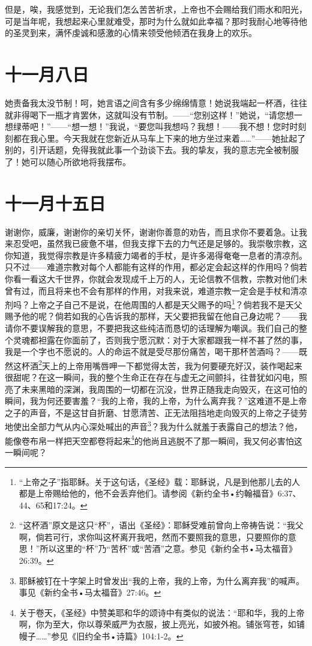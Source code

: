 \documentclass[12pt,oneside]{book}
\begin{document}
但是，唉，我感觉到，无论我们怎么苦苦祈求，上帝也不会赐给我们雨水和阳光，可是当年呢，我想起来心里就难受，那时为什么就如此幸福？那时我耐心地等待他的圣灵到来，满怀虔诚和感激的心情来领受他倾洒在我身上的欢乐。
　　

\chapter{十一月八日}
\label{sec-4-25}
她责备我太没节制！呵，她言语之间含有多少绵绵情意！她说我端起一杯酒，往往就非得喝下一瓶才肯罢休，这就叫没有节制。——“您别这样！”她说，“请您想一想绿蒂吧！”——“想一想！”我说，“要您叫我想吗？我想！——我不想！您时时刻刻都在我心里。今天我就在您新近从马车上下来的地方坐过来着……”——她扯起了别的，引开话题，免得我就此事一个劲谈下去。我的挚友，我的意志完全被制服了！她可以随心所欲地将我摆布。
　　

\chapter{十一月十五日}
\label{sec-4-26}
谢谢你，威廉，谢谢你的亲切关怀，谢谢你善意的劝告，而且求你不要着急。让我来忍受吧，虽然我已疲惫不堪，但我支撑下去的力气还是足够的。我崇敬宗教，这你知道，我觉得宗教是许多精疲力竭者的手杖，是许多渴得奄奄一息者的清凉剂。只不过——难道宗教对每个人都能有这样的作用，都必定会起这样的作用吗？倘若你看一看这大千世界，你就会发现成千上万的人，无论信教不信教，宗教对他们未曾有过，而且将来也不会有那样的作用，对我来说，难道宗教一定会是手杖和清凉剂吗？上帝之子自己不是说，在他周围的人都是天父赐予的吗\footnote{“上帝之子”指耶稣。关于这句话，《圣经》载：耶稣说，凡是到他那儿去的人都是上帝赐给他的，他不会丢弃他们。请参阅《新约全书•约翰福音》6:37、44、65和17:24。}？倘若我不是天父赐予他的呢？倘若如我的心告诉我的那样，天父要把我留在他自己身边呢？——我请你不要误解我的意思，不要把我这些纯洁而恳切的话理解为嘲讽。我们自己的整个灵魂都袒露在你面前了，否则我宁愿沉默：对于大家都跟我一样不甚了然的事，我是一个字也不愿说的。人的命运不就是受尽那份痛苦，喝干那杯苦酒吗？——既然这杯酒\footnote{“这杯酒”原文是这只“杯”，语出《圣经》：耶稣受难前曾向上帝祷告说：“我父啊，倘若可行，求你叫这杯离开我吧，然而不要照我的意思，只要照你的意思！”所以这里的“杯”乃“苦杯”或“苦酒”之意。参见《新约全书•马太福音》26:39。}天上的上帝用嘴唇呷一下都觉得太苦，我为何要硬充好汉，装作喝起来很甜呢？在这一瞬间，我的整个生命正在存在与虚无之间颤抖，往昔犹如闪电，照亮了未来黑暗的深渊，我周围的一切都在沉没，世界正随我走向毁灭，在这可怕的瞬间，我为何还要害羞？“我的上帝，我的上帝，为什么离弃我？”这难道不是上帝之子的声音，不是这甘自折磨、甘愿清苦、正无法阻挡地走向毁灭的上帝之子徒劳地使出全部力气从内心深处喊出的声音\footnote{耶稣被钉在十字架上时曾发出“我的上帝，我的上帝，为什么离弃我”的喊声。事见《新约全书•马太福音》27:46。}？我为什么就羞于表露自己的想法？他，能像卷布帛一样把天空都卷将起来\footnote{关于卷天，《圣经》中赞美耶和华的颂诗中有类似的说法：“耶和华，我的上帝啊，你为至大，你以尊荣威严为衣服，披上亮光，如披外袍。铺张穹苍，如铺幔子……”参见《旧约全书•诗篇》104:1-2。}的他尚且逃脱不了那一瞬间，我又何必害怕这一瞬间呢？
　　
\end{document}
